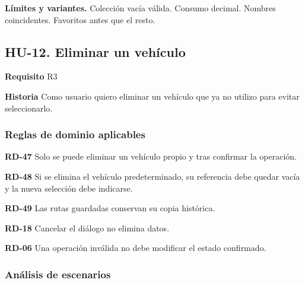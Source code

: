{\fontsize{9}{11.8}\selectfont\textbf{Límites y variantes.} Colección vacía válida. Consumo decimal. Nombres coincidentes. Favoritos antes que el resto.\par}\vspace{4pt}
\clearpage\subsection*{HU-12. Eliminar un vehículo}

\textbf{Requisito} R3\par

\textbf{Historia} Como usuario quiero eliminar un vehículo que ya no utilizo para evitar seleccionarlo.\par

\subsubsection*{Reglas de dominio aplicables}

\textbf{RD-47} Solo se puede eliminar un vehículo propio y tras confirmar la operación.\par

\textbf{RD-48} Si se elimina el vehículo predeterminado, su referencia debe quedar vacía y la nueva selección debe indicarse.\par

\textbf{RD-49} Las rutas guardadas conservan su copia histórica.\par

\textbf{RD-18} Cancelar el diálogo no elimina datos.\par

\textbf{RD-06} Una operación inválida no debe modificar el estado confirmado.\par

\subsubsection*{Análisis de escenarios}

